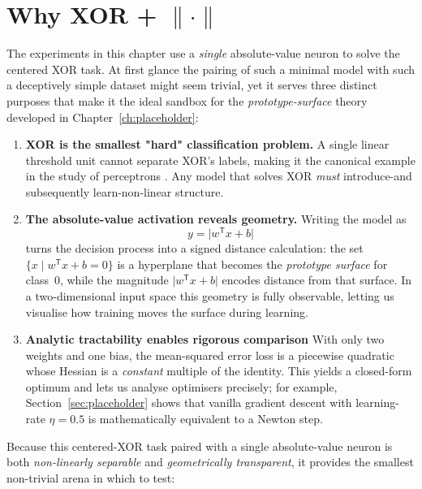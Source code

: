﻿%
\section{Why XOR + $\|\cdot\|$}
\label{sec:abs1-motivation}

The experiments in this chapter use a \emph{single} absolute-value neuron to solve the centered XOR task.  At first glance the pairing of such a minimal model with such a deceptively simple dataset might seem trivial, yet it serves three distinct purposes that make it the ideal sandbox for the \textit{prototype-surface} theory developed in Chapter~\ref{ch:placeholder}:

\begin{enumerate}[leftmargin=*]

\item \textbf{XOR is the smallest "hard" classification problem.}
A single linear threshold unit cannot separate XOR's labels, making it the canonical example in the study of perceptrons
\cite{minsky1969perceptrons}.  Any model that solves XOR \emph{must} introduce-and subsequently learn-non-linear structure.

\item \textbf{The absolute-value activation reveals geometry.}
Writing the model as
\[
y = \lvert w^{\mathsf T}x + b \rvert
\]
turns the decision process into a signed distance calculation: the set $\{x \mid w^{\mathsf T}x + b = 0\}$ is a hyperplane that becomes the \emph{prototype surface} for class~$0$, while the magnitude $\lvert w^{\mathsf T}x + b\rvert$ encodes distance from that surface. In a two-dimensional input space this geometry is fully observable, letting us visualise how training moves the surface during learning.

\item \textbf{Analytic tractability enables rigorous comparison}
With only two weights and one bias, the mean-squared error loss is a piecewise quadratic whose Hessian is a \emph{constant} multiple of the identity.  This yields a closed-form optimum and lets us analyse
optimisers precisely; for example, Section~\ref{sec:placeholder} shows that vanilla gradient descent with learning-rate
$\eta = 0.5$ is mathematically equivalent to a Newton step.

\end{enumerate}

Because this centered-XOR task paired with a single absolute-value neuron is both \emph{non-linearly separable} and \emph{geometrically transparent}, it provides the smallest non-trivial arena in which to test:

